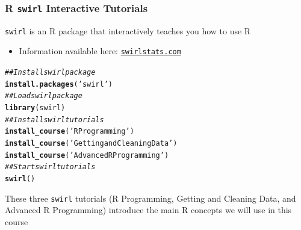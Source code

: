 \documentclass{beamer}\usepackage[]{graphicx}\usepackage[]{color}
\makeatletter
\newcommand{\hlstr}[1]{\textcolor[rgb]{0.192,0.494,0.8}{#1}}%
\newcommand{\hlcom}[1]{\textcolor[rgb]{0.678,0.584,0.686}{\textit{#1}}}%
\newcommand{\hlstd}[1]{\textcolor[rgb]{0.345,0.345,0.345}{#1}}%
\newcommand{\hlkwd}[1]{\textcolor[rgb]{0.737,0.353,0.396}{\textbf{#1}}}%
\newenvironment{kframe}{%
 \def\at@end@of@kframe{}%
 \ifinner\ifhmode%
  \def\at@end@of@kframe{\end{minipage}}%
  \begin{minipage}{\columnwidth}%
 \fi\fi%
 \def\FrameCommand##1{\hskip\@totalleftmargin \hskip-\fboxsep
 \colorbox{shadecolor}{##1}\hskip-\fboxsep
     \hskip-\linewidth \hskip-\@totalleftmargin \hskip\columnwidth}%
 \MakeFramed {\advance\hsize-\width
   \@totalleftmargin\z@ \linewidth\hsize
   \@setminipage}}%
 {\par\unskip\endMakeFramed%
 \at@end@of@kframe}
\newenvironment{knitrout}{}{} %
\makeatother
\begin{document}

\begin{frame}[fragile]\frametitle{R \texttt{swirl} Interactive Tutorials}
    \texttt{swirl} is an R package that interactively teaches you how to use R
    \begin{itemize}
    	\item Information available here: \href{https://swirlstats.com/}{\texttt{swirlstats.com}}
    \end{itemize}
    \vspace{2ex}
\begin{knitrout}\footnotesize
{}\color{fgcolor}\begin{kframe}
\begin{alltt}
\hlcom{## Install swirl package}
\hlkwd{install.packages}\hlstd{(}\hlstr{'swirl'}\hlstd{)}
\hlcom{## Load swirl package}
\hlkwd{library}\hlstd{(swirl)}
\hlcom{## Install swirl tutorials}
\hlkwd{install_course}\hlstd{(}\hlstr{'R Programming'}\hlstd{)}
\hlkwd{install_course}\hlstd{(}\hlstr{'Getting and Cleaning Data'}\hlstd{)}
\hlkwd{install_course}\hlstd{(}\hlstr{'Advanced R Programming'}\hlstd{)}
\hlcom{## Start swirl tutorials}
\hlkwd{swirl}\hlstd{()}
\end{alltt}
\end{kframe}
\end{knitrout}
    \vspace{2ex}
    These three \texttt{swirl} tutorials (R Programming, Getting and Cleaning Data, and Advanced R Programming) introduce the main R concepts we will use in this course
\end{frame}
\end{document}
